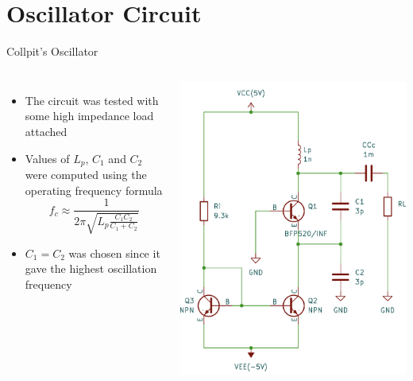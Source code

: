 \documentclass{beamer}
\begin{document}


\section{Oscillator Circuit}

\begin{frame}{Collpit's Oscillator}
\begin{columns}
  \begin{itemize}
    \item <1-> The circuit was tested with some high impedance load attached
    \item <2-> Values of \(L_p\), \(C_1\) and \(C_2\) were computed using the operating frequency formula \[f_c\approx\frac{1}{2\pi\sqrt{L_p\frac{C_1C_2}{C_1+C_2}}}\]
    \item <3-> \(C_1=C_2\) was chosen since it gave the highest oscillation frequency
  \end{itemize}
  \includegraphics[width=0.95\linewidth]{images/collpits.png}
\end{columns}

\end{frame}
\end{document}

